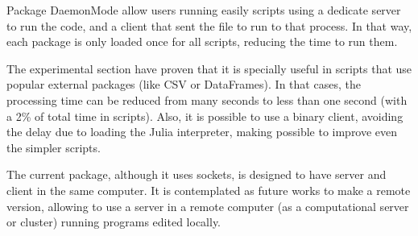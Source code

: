\documentclass{juliacon}
\begin{document}
Package DaemonMode allow users running easily scripts using a dedicate server to run the
code, and a client that sent the file to run to that process. In that way,
each package is only loaded once for all scripts, reducing the time to run them.

The experimental section have proven that it is specially useful in scripts that
use popular external packages (like CSV or DataFrames). In that cases, the
processing time can be reduced from many seconds to less than one second (with a
2\% of total time in scripts). Also, it is possible to use a binary client, avoiding the
delay due to loading the Julia interpreter, making possible to improve even the
simpler scripts.

The current package, although it uses sockets, is designed to have server and
client in the same computer. It is contemplated as future works to make a remote
version, allowing to use a server in a remote computer (as a computational
server or cluster) running programs edited locally.


\end{document}
